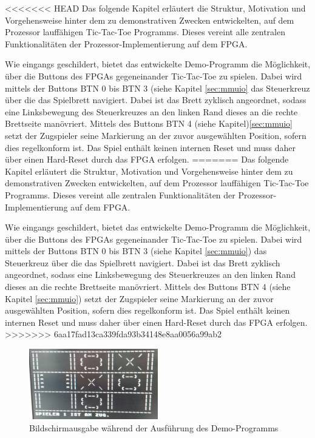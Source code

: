 
<<<<<<< HEAD
Das folgende Kapitel erl\"autert die Struktur, Motivation und Vorgehensweise hinter dem zu demonstrativen Zwecken entwickelten, auf dem Prozessor lauffähigen Tic-Tac-Toe Programms. Dieses vereint alle zentralen Funktionalitäten der Prozessor-Implementierung auf dem FPGA.


Wie eingangs geschildert, bietet das entwickelte Demo-Programm die M\"oglichkeit, \"uber die Buttons des FPGAs gegeneinander Tic-Tac-Toe zu spielen. Dabei wird mittels der Buttons BTN 0 bis BTN 3 (siehe Kapitel \ref{sec:mmuio} das Steuerkreuz \"uber die das Spielbrett navigiert. Dabei ist das Brett zyklisch angeordnet, sodass eine Linksbewegung des Steuerkreuzes an den linken Rand dieses an die rechte Brettseite man\"ovriert. Mittels des Buttons BTN 4 (siehe Kapitel)\ref{sec:mmuio} setzt der Zugspieler seine Markierung an der zuvor ausgew\"ahlten Position, sofern dies regelkonform ist. Das Spiel enthält keinen internen Reset und muss daher \"uber einen Hard-Reset durch das FPGA erfolgen.
=======
Das folgende Kapitel erl\"autert die Struktur, Motivation und Vorgehensweise hinter dem zu demonstrativen Zwecken entwickelten, auf dem Prozessor lauff\"ahigen Tic-Tac-Toe Programms. Dieses vereint alle zentralen Funktionalit\"aten der Prozessor-Implementierung auf dem FPGA.


Wie eingangs geschildert, bietet das entwickelte Demo-Programm die M\"oglichkeit, \"uber die Buttons des FPGAs gegeneinander Tic-Tac-Toe zu spielen. Dabei wird mittels der Buttons BTN 0 bis BTN 3 (siehe Kapitel \ref{sec:mmuio}) das Steuerkreuz über die das Spielbrett navigiert. Dabei ist das Brett zyklisch angeordnet, sodass eine Linksbewegung des Steuerkreuzes an den linken Rand dieses an die rechte Brettseite man\"ovriert. Mittels des Buttons BTN 4 (siehe Kapitel \ref{sec:mmuio}) setzt der Zugspieler seine Markierung an der zuvor ausgew\"ahlten Position, sofern dies regelkonform ist. Das Spiel enth\"alt keinen internen Reset und muss daher \"uber einen Hard-Reset durch das FPGA erfolgen.
>>>>>>> 6aa17fad13ca339fda93b34148e8aa0056a99ab2

\begin{figure}[H]
	\centering
	\label{fig:gameplay}
		\includegraphics[width=0.5\textwidth]{gameplay.png}
	\caption{Bildschirmausgabe w\"ahrend der Ausf\"uhrung des Demo-Programms}
\end{figure}

